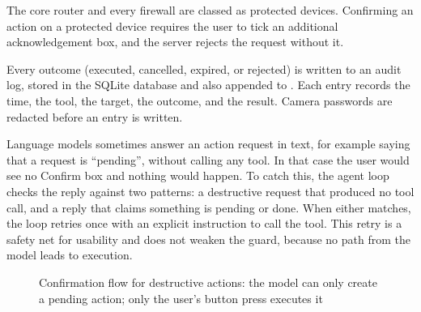 The core router and every firewall are classed as protected devices.
Confirming an action on a protected device requires the user to tick an
additional acknowledgement box, and the server rejects the request without
it.

Every outcome (executed, cancelled, expired, or rejected) is written to an
audit log, stored in the SQLite database and also appended to
. Each entry records the time, the tool, the target,
the outcome, and the result. Camera passwords are redacted before an entry is
written.

Language models sometimes answer an action request in text, for example
saying that a request is ``pending'', without calling any tool. In that case
the user would see no Confirm box and nothing would happen. To catch this,
the agent loop checks the reply against two patterns: a destructive request
that produced no tool call, and a reply that claims something is pending or
done. When either matches, the loop retries once with an explicit instruction
to call the tool. This retry is a safety net for usability and does not weaken
the guard, because no path from the model leads to execution.

\begin{figure}[H]
\centering
{}
\caption{Confirmation flow for destructive actions: the model can only create a pending action; only the user's button press executes it}
\label{fig:confirm}
\end{figure}

